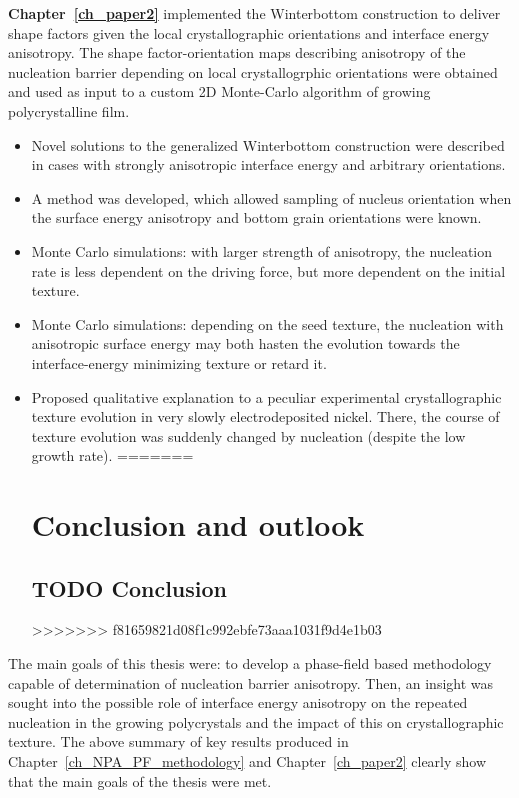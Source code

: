 \textbf{Chapter~\ref{ch_paper2}} implemented the Winterbottom construction to deliver shape factors given the local crystallographic orientations and interface energy anisotropy. The shape factor-orientation maps describing anisotropy of the nucleation barrier depending on local crystallogrphic orientations were obtained and used as input to a custom 2D Monte-Carlo algorithm of growing polycrystalline film.
\begin{itemize}
	\item Novel solutions to the generalized Winterbottom construction were described in cases with strongly anisotropic interface energy and arbitrary orientations.
	\item A method was developed, which allowed sampling of nucleus orientation when the surface energy anisotropy and bottom grain orientations were known.
	\item Monte Carlo simulations: with larger strength of anisotropy, the nucleation rate is less dependent on the driving force, but more dependent on the initial texture.
	\item Monte Carlo simulations: depending on the seed texture, the nucleation with anisotropic surface energy may both hasten the evolution towards the interface-energy minimizing texture or retard it.
	\item Proposed qualitative explanation to a peculiar experimental crystallographic texture evolution in very slowly electrodeposited nickel. There, the course of texture evolution was suddenly changed by nucleation (despite the low growth rate).
=======
\chapter{Conclusion and outlook} \label{ch_conclusion}
\section{TODO Conclusion}
>>>>>>> f81659821d08f1c992ebfe73aaa1031f9d4e1b03
	
\end{itemize}

The main goals of this thesis were: to develop a phase-field based methodology capable of determination of nucleation barrier anisotropy. Then, an insight was sought into the possible role of interface energy anisotropy on the repeated nucleation in the growing polycrystals and the impact of this on crystallographic texture. The above summary of key results produced in Chapter~\ref{ch_NPA_PF_methodology} and Chapter~\ref{ch_paper2} clearly show that the main goals of the thesis were met.
	
